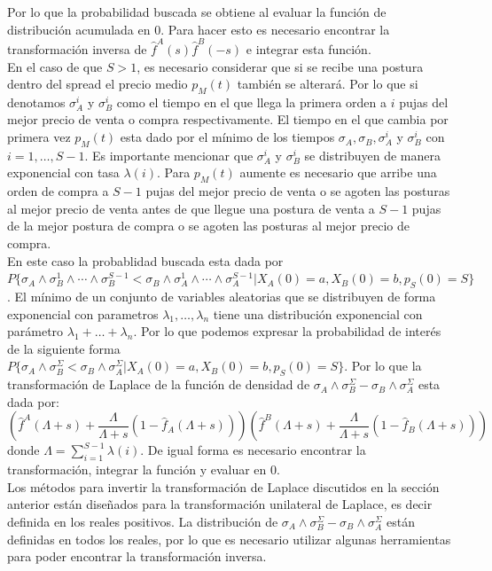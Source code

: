 \documentclass[11pt]{article}
\numberwithin{equation}{section} %
\begin{document}
Por lo que la probabilidad buscada se obtiene al evaluar la función de distribución acumulada en 0. Para hacer esto es necesario encontrar la transformación inversa de $\hat{f}^A(s)\hat{f}^B(-s)$ e integrar esta función.\\

En el caso de que $S>1$, es necesario considerar que si se recibe una postura dentro del spread el precio medio $p_M(t)$ también se alterará. Por lo que si denotamos $\sigma_A^i$ y $\sigma_B^i$ como el tiempo en el que llega la primera orden a $i$ pujas del mejor precio de venta o compra respectivamente. El tiempo en el que cambia por primera vez $p_M(t)$ esta dado por el mínimo de los tiempos $\sigma_A,\sigma_B,\sigma_A^i$ y $\sigma_B^i$ con $i=1,\ldots,S-1$. Es importante mencionar que $\sigma_A^i$ y $\sigma_B^i$ se distribuyen de manera exponencial con tasa $\lambda(i)$. Para $p_M(t)$ aumente es necesario que arribe una orden de compra a $S-1$ pujas del mejor precio de venta o se agoten las posturas al mejor precio de venta antes de que llegue una postura de venta a $S-1$ pujas de la mejor postura de compra o se agoten las posturas al mejor precio de compra.\\

En este caso la probablidad buscada esta dada por $P\{\sigma_A \land \sigma_B^1 \land \cdots \land \sigma_B^{S-1} < \sigma_B \land \sigma_A^1 \land \cdots \land \sigma_A^{S-1}|X_A(0)=a,X_B(0)=b,p_S(0)=S\}$. El mínimo de un conjunto de variables aleatorias que se distribuyen de forma exponencial con parametros $\lambda_1,\ldots,\lambda_n$ tiene una distribución exponencial con parámetro $\lambda_1+\ldots+\lambda_n$. Por lo que podemos expresar la probabilidad de interés de la siguiente forma $P\{\sigma_A \land \sigma_B^\Sigma < \sigma_B \land \sigma_A^\Sigma|X_A(0)=a,X_B(0)=b,p_S(0)=S\}$. Por lo que la transformación de Laplace de la función de densidad de $\sigma_A \land \sigma_B^\Sigma - \sigma_B \land \sigma_A^\Sigma$ esta dada por:
\[
\left(\hat{f}^A(\Lambda+s)+\frac{\Lambda}{\Lambda+s}(1-\hat{f}_A(\Lambda+s))\right)
\left(\hat{f}^B(\Lambda+s)+\frac{\Lambda}{\Lambda+s}(1-\hat{f}_B(\Lambda+s))\right)
\]
donde $\Lambda=\sum_{i=1}^{S-1}\lambda(i)$. De igual forma es necesario encontrar la transformación, integrar la función y evaluar en 0.\\

Los métodos para invertir la transformación de Laplace discutidos en la sección anterior están diseñados para la transformación unilateral de Laplace, es decir definida en los reales positivos. La distribución de  $\sigma_A \land \sigma_B^\Sigma - \sigma_B \land \sigma_A^\Sigma$ están definidas en todos los reales, por lo que es necesario utilizar algunas herramientas para poder encontrar la transformación inversa.\\
\end{document}
